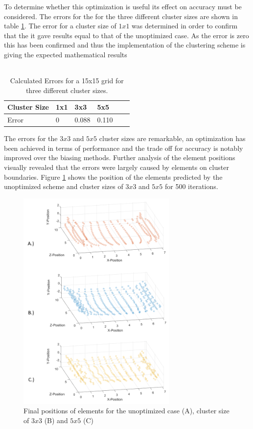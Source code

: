 To determine whether this optimization is useful its effect on accuracy must be considered. The errors for the for the three different cluster sizes are shown in table \ref{tab:FixedClusterErrors}. The error for a cluster size of $1x1$ was determined in order to confirm that the it gave results equal to that of the unoptimized case. As the error is zero this has been confirmed and thus the implementation of the clustering scheme is giving the expected mathematical results
\\\\

\begin{table}[H]
\centering
\label{tab:FixedClusterErrors}
\begin{tabular}{llllll}
\multicolumn{1}{l|}{Cluster Size} & 1x1 & 3x3   & 5x5 \\ \hline
\multicolumn{1}{l|}{Error}        & 0   & 0.088 & 0.110 
\end{tabular}
\caption{Calculated Errors for a 15x15 grid for three different cluster sizes.}
\end{table}

The errors for the $3x3$ and $5x5$ cluster sizes are remarkable, an optimization has been achieved in terms of performance and the trade off for accuracy is notably improved over the biasing methods. Further analysis of the element positions visually revealed that the errors were largely caused by elements on cluster boundaries. Figure \ref{fig:FixedClusterPositions} shows the position of the elements predicted by the unoptimized scheme and cluster sizes of $3x3$ and $5x5$ for 500 iterations. 

\begin{figure}[H]
\centering
\includegraphics[width=0.7\textwidth]{Figures/FixedClusterImpression.png}
\caption{\label{fig:FixedClusterPositions} Final positions of elements for the unoptimized case (A), cluster size of $3x3$ (B) and $5x5$ (C)}
\end{figure} 

